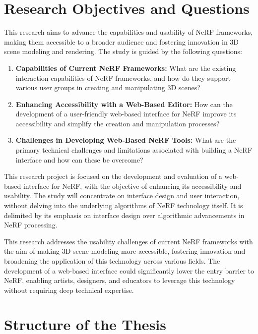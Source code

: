 \section{Research Objectives and Questions}
\label{sec:intro:objectives_questions}

This research aims to advance the capabilities and usability of NeRF frameworks, making them accessible to a broader audience and fostering innovation in 3D scene modeling and rendering. The study is guided by the following questions:

\begin{enumerate}
    \item \textbf{Capabilities of Current NeRF Frameworks:} What are the existing interaction capabilities of NeRF frameworks, and how do they support various user groups in creating and manipulating 3D scenes?

    \item \textbf{Enhancing Accessibility with a Web-Based Editor:} How can the development of a user-friendly web-based interface for NeRF improve its accessibility and simplify the creation and manipulation processes?

    \item \textbf{Challenges in Developing Web-Based NeRF Tools:} What are the primary technical challenges and limitations associated with building a NeRF interface and how can these be overcome?
\end{enumerate}

This research project is focused on the development and evaluation of a web-based interface for NeRF, with the objective of enhancing its accessibility and usability.
The study will concentrate on interface design and user interaction, without delving into the underlying algorithms of NeRF technology itself.
It is delimited by its emphasis on interface design over algorithmic advancements in NeRF processing.

This research addresses the usability challenges of current NeRF frameworks with the aim of making 3D scene modeling more accessible, fostering innovation and broadening the application of this technology across various fields.
The development of a web-based interface could significantly lower the entry barrier to NeRF, enabling artists, designers, and educators to leverage this technology without requiring deep technical expertise.

\section{Structure of the Thesis}
\label{sec:intro:structure}

